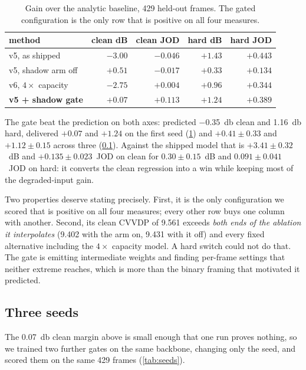 \begin{table}[htbp]
\centering
\caption{Gain over the analytic baseline, 429 held-out frames. The gated
configuration is the only row that is positive on all four measures.}
\label{tab:gate}
\begin{tabular}{lrrrr}
\toprule
method & clean dB & clean JOD & hard dB & hard JOD \\
\midrule
v5, as shipped            & $-3.00$ & $-0.046$ & \textbf{$+1.43$} & \textbf{$+0.443$} \\
v5, shadow arm off        & $+0.51$ & $-0.017$ & $+0.33$ & $+0.134$ \\
v6, $4\times$ capacity    & $-2.75$ & $+0.004$ & $+0.96$ & $+0.344$ \\
\textbf{v5 + shadow gate} & \textbf{$+0.07$} & \textbf{$+0.113$} & \textbf{$+1.24$} & \textbf{$+0.389$} \\
\bottomrule
\end{tabular}
\end{table}

The gate beat the prediction on both axes: predicted \SI{-0.35}{\decibel} clean
and \SI{+1.16}{\decibel} hard, delivered $+0.07$ and $+1.24$ on the first seed
(\cref{tab:gate}) and $+0.41 \pm 0.33$ and $+1.12 \pm 0.15$ across three
(\cref{sec:seeds}). Against the shipped model that is
$+3.41 \pm 0.32$~dB and $+0.135 \pm 0.023$~JOD on clean for
$0.30 \pm 0.15$~dB and $0.091 \pm 0.041$~JOD on hard: it converts the
clean regression into a win while keeping most of the degraded-input gain.

Two properties deserve stating precisely. First, it is the only configuration we
scored that is positive on all four measures; every other row buys one column
with another. Second, its clean CVVDP of \num{9.561} exceeds \emph{both ends of
the ablation it interpolates} (\num{9.402} with the arm on, \num{9.431} with it
off) and every fixed alternative including the $4\times$ capacity model. A hard
switch could not do that. The gate is emitting intermediate weights and finding
per-frame settings that neither extreme reaches, which is more than the binary
framing that motivated it predicted.

\subsection{Three seeds}
\label{sec:seeds}

The \SI{+0.07}{\decibel} clean margin above is small enough that one run proves
nothing, so we trained two further gates on the same backbone, changing only the
seed, and scored them on the same 429 frames (\cref{tab:seeds}).

